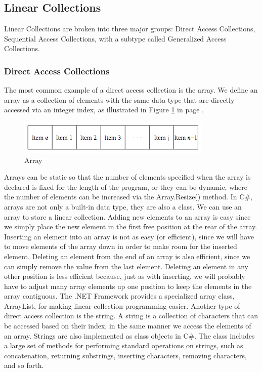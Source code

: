 \documentclass[12pt,a4paper,final,twoside,titlepage]{book}
\begin{document}
\subsection{Linear Collections}
Linear Collections are broken into three major groups: Direct Access Collections, Sequential Access Collections, with a subtype called Generalized Access Collections.
\subsubsection{Direct Access Collections}
The most common example of a direct access collection is the array. We define an array as a collection of elements with the same data type that are directly accessed via an integer index, as illustrated in Figure \ref{Array} in page \pageref{Array}.
\begin{figure}
\begin{center}
\includegraphics[scale=0.75]{Array}
\end{center}\caption{Array}
\label{Array}
\end{figure}
Arrays can be static so that the number of elements specified when the array is declared is fixed for the length of the program, or they can be dynamic, where the number of elements can be increased via the Array.Resize() method.
In C\#, arrays are not only a built-in data type, they are also a class. We can use an array to store a linear collection. Adding new elements to an array is easy since we simply place the new element in the first free position at the rear of the array. Inserting an element into an array is not as easy (or efficient), since we will have to move elements of the array down in order to make room for the inserted element. Deleting an element from the end of an array is also efficient, since we can simply remove the value from the last element. Deleting an element in any other position is less efficient because, just as with inserting, we will probably have to adjust many array elements up one position to keep the elements in the array contiguous. The .NET Framework provides a specialized array class, ArrayList, for making linear collection programming easier.
Another type of direct access collection is the string. A string is a collection of characters that can be accessed based on their index, in the same manner we access the elements of an array. Strings are also implemented as class objects in C\#. The class includes a large set of methods for performing standard operations on strings, such as concatenation, returning substrings, inserting characters, removing characters, and so forth.
\end{document}
